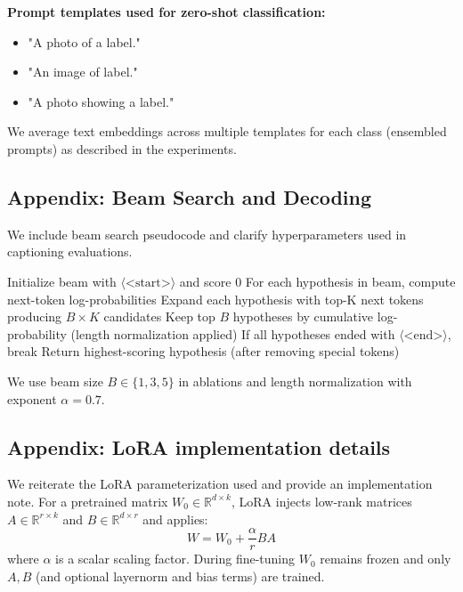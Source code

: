 \documentclass[conference]{IEEEtran}
\begin{document}
\textbf{Prompt templates used for zero-shot classification:}
\begin{itemize}
  \item "A photo of a {label}."
  \item "An image of {label}."
  \item "A photo showing a {label}."
\end{itemize}
We average text embeddings across multiple templates for each class (ensembled prompts) as described in the experiments.

\subsection{Appendix: Beam Search and Decoding}\label{appendix:decoding}
We include beam search pseudocode and clarify hyperparameters used in captioning evaluations.
\begin{algorithm}
\caption{Beam search decoding (beam width \(B\))}
\begin{algorithmic}[1]
\State Initialize beam with \(\langle\text{<start>}\rangle\) and score 0
  \State For each hypothesis in beam, compute next-token log-probabilities
  \State Expand each hypothesis with top-K next tokens producing \(B\times K\) candidates
  \State Keep top \(B\) hypotheses by cumulative log-probability (length normalization applied)
  \State If all hypotheses ended with \(\langle\text{<end>}\rangle\), break
\EndFor
\State Return highest-scoring hypothesis (after removing special tokens)
\end{algorithmic}
\end{algorithm}
We use beam size \(B\in\{1,3,5\}\) in ablations and length normalization with exponent \(\alpha=0.7\).

\subsection{Appendix: LoRA implementation details}\label{appendix:lora}
We reiterate the LoRA parameterization used and provide an implementation note. For a pretrained matrix \(W_0\in\mathbb{R}^{d\times k}\), LoRA injects low-rank matrices \(A\in\mathbb{R}^{r\times k}\) and \(B\in\mathbb{R}^{d\times r}\) and applies:
\begin{equation}
W = W_0 + \frac{\alpha}{r} BA
\end{equation}
where \(\alpha\) is a scalar scaling factor. During fine-tuning \(W_0\) remains frozen and only \(A,B\) (and optional layernorm and bias terms) are trained.
\end{document}
